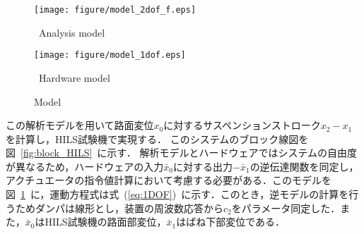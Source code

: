 \documentclass{article_vdlab_sotsuron_youshi}
\begin{document}
\vspace{-2mm}
\begin{figure}[h]
  \begin{minipage}{0.5\hsize}
     \begin{center}
      \texttt{[image: figure/model\_2dof\_f.eps]}
      \end{center}
      \begin{center}
	\vspace{-2mm}
      \ Analysis model
      \label{fig:2DOF}
    \end{center}
  \end{minipage}
  \begin{minipage}{0.5\hsize}
     \begin{center}
      \texttt{[image: figure/model\_1dof.eps]}
      \end{center}
      \begin{center}
	\vspace{-2mm}
      \ Hardware model
      \label{fig:1DOF}
    \end{center}
  \end{minipage}
% 
\vspace{2mm}
\caption{Model}
\end{figure}

\vspace{-2mm}
\par
この解析モデルを用いて路面変位$x_0$に対するサスペンションストローク$x_2-x_1$を計算し，HILS試験機で実現する．
このシステムのブロック線図を図~\ref{fig:block_HILS}~に示す．
解析モデルとハードウェアではシステムの自由度が異なるため，ハードウェアの入力$\bar{x}_0$に対する出力$-\bar{x}_1$の逆伝達関数を同定し，アクチュエータの指令値計算において考慮する必要がある．このモデルを図~\ref{fig:1DOF}~に，運動方程式は式~(\ref{eq:1DOF})~に示す．このとき，逆モデルの計算を行うためダンパは線形とし，装置の周波数応答から$c_2$をパラメータ同定した．また，$\bar{x}_0$はHILS試験機の路面部変位，$\bar{x}_1$はばね下部変位である．
\end{document}
